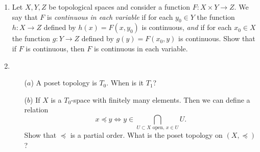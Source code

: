 \begin{enumerate}
  
  \item Let $X,Y,Z$ be topological spaces and consider a function $F:X\times Y\rightarrow Z$. We say that $F$ is \emph{continuous in each variable} if for each $y_0\in Y$ the function $h:X\rightarrow Z$ defined by $h(x)=F(x,y_0)$ is continuous, \emph{and} if for each $x_0\in X$ the function $g:Y\rightarrow Z$ defined by $g(y) = F(x_0,y)$ is continuous. Show that if $F$ is continuous, then $F$ is continuous in each variable.
  
  \item \begin{itemize}
		\item[($a$)] A poset topology is $T_0$. When is it $T_1$?
		\item[($b$)] If $X$ is a $T_0$-space with finitely many elements. Then we can define a relation
		\[x\preceq y \Leftrightarrow y\in \bigcap_{U\subset X\text{ open}, \,x\in U} U.\]
		Show that $\preceq$ is a partial order. What is the poset topology on $(X,\preceq)$?
	\end{itemize}
\end{enumerate}

